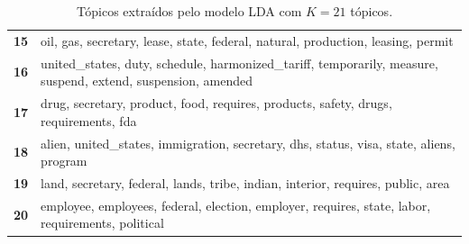 \begin{table}[htpb]
\begin{tabularx}{\textwidth}{@{}l X@{}}
        \textbf{15} & oil, gas, secretary, lease, state, federal, natural, production, leasing, permit \\
        \textbf{16} & united\_states, duty, schedule, harmonized\_tariff, temporarily, measure, suspend, extend, suspension, amended \\
        \textbf{17} & drug, secretary, product, food, requires, products, safety, drugs, requirements, fda \\
        \textbf{18} & alien, united\_states, immigration, secretary, dhs, status, visa, state, aliens, program \\
        \textbf{19} & land, secretary, federal, lands, tribe, indian, interior, requires, public, area \\
        \textbf{20} & employee, employees, federal, election, employer, requires, state, labor, requirements, political \\
        \bottomrule
    \end{tabularx}
    \caption{Tópicos extraídos pelo modelo LDA com $K=21$ tópicos.}
    \label{tab:topicos_lda_21}
\end{table}
